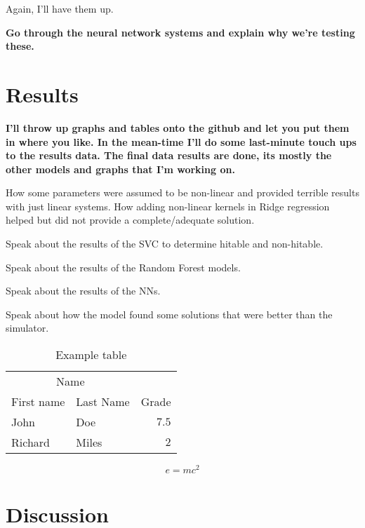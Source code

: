 \documentclass[twoside,twocolumn]{article}
\begin{document}
Again, I'll have them up.

\textbf{Go through the neural network systems and explain why we're testing these.}


\section{Results}

\textbf{I'll throw up graphs and tables onto the github and let you put them in where you like. In the mean-time I'll do some last-minute touch ups to the results data. The final data results are done, its mostly the other models and graphs that I'm working on.}

How some parameters were assumed to be non-linear and provided terrible results with just linear systems.
How adding non-linear kernels in Ridge regression helped but did not provide a complete/adequate solution.

Speak about the results of the SVC to determine hitable and non-hitable.

Speak about the results of the Random Forest models.

Speak about the results of the NNs.

Speak about how the model found some solutions that were better than the simulator.

\begin{table}
\caption{Example table}
\centering
\begin{tabular}{llr}
\toprule
\multicolumn{2}{c}{Name} \\
\cmidrule(r){1-2}
First name & Last Name & Grade \\
\midrule
John & Doe & $7.5$ \\
Richard & Miles & $2$ \\
\bottomrule
\end{tabular}
\end{table}

\blindtext %

\begin{equation}
\label{eq:emc}
e = mc^2
\end{equation}

\blindtext %


\section{Discussion}
\end{document}
